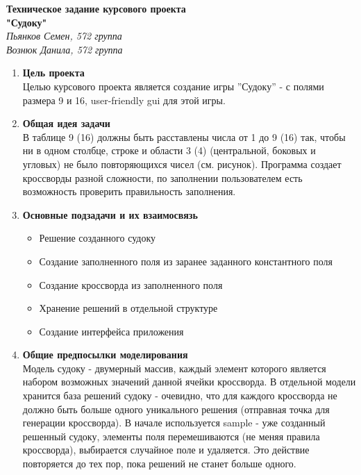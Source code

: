 \documentclass[12pt]{article}
\begin{document}
\begin{Large}
\begin{center}

\textbf{Техническое задание курсового проекта \\ "Судоку"\\}
\textit{Пьянков Семен, 572 группа\\
Вознюк Данила, 572 группа}

\end{center}
\end{Large}

\begin{enumerate}
\item \textbf{Цель проекта}\\
Целью курсового проекта является создание игры ''Судоку'' - с полями размера 9 и 16, user-friendly gui для этой игры.

\item \textbf{Общая идея задачи}\\
В таблице 9 (16) должны быть расставлены числа от 1 до 9 (16) так, чтобы ни в одном столбце, строке и области 3 (4) (центральной, боковых и угловых) не было повторяющихся чисел (см. рисунок). Программа создает кроссворды разной сложности, по заполнении пользователем есть возможность проверить правильность заполнения.

\item \textbf{Основные подзадачи и их взаимосвязь}
\begin{itemize}
    \item Решение созданного судоку
    \item Создание заполненного поля из заранее заданного константного поля
    \item Создание кроссворда из заполненного поля
    \item Хранение решений в отдельной структуре
    \item Создание интерфейса приложения
\end{itemize}

\item \textbf{Общие предпосылки моделирования} \\
Модель судоку - двумерный массив, каждый элемент которого является набором возможных значений данной ячейки кроссворда. В отдельной модели хранится база решений судоку - очевидно, что для каждого кроссворда не должно быть больше одного уникального решения (отправная точка для генерации кроссворда). В начале используется sample - уже созданный решенный судоку, элементы поля перемешиваются (не меняя правила кроссворда), выбирается случайное поле и удаляется. Это действие повторяется до тех пор, пока решений не станет больше одного.


\end{enumerate}
\end{document}

